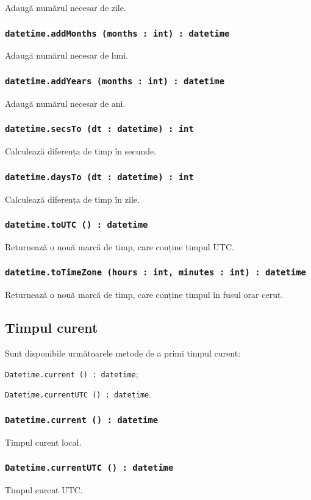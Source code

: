 Adaugă numărul necesar de zile.

\subsubsection{\texttt{datetime.addMonths (months : int) : datetime}}

Adaugă numărul necesar de luni.

\subsubsection{\texttt{datetime.addYears (months : int) : datetime}}

Adaugă numărul necesar de ani.

\subsubsection{\texttt{datetime.secsTo (dt : datetime) : int}}

Calculează diferența de timp în secunde.

\subsubsection{\texttt{datetime.daysTo (dt : datetime) : int}}

Calculează diferența de timp în zile.

\subsubsection{\texttt{datetime.toUTC () : datetime}}

Returnează o nouă marcă de timp, care conține timpul UTC.

\subsubsection{\texttt{datetime.toTimeZone (hours : int, minutes : int) : datetime}}

Returnează o nouă marcă de timp, care conține timpul în fusul orar cerut.

\subsection{Timpul curent}

Sunt disponibile următoarele metode de a primi timpul curent:
\begin{icItems}
	\item \texttt{Datetime.current () : datetime};
	\item \texttt{Datetime.currentUTC () : datetime}.
\end{icItems}

\subsubsection{\texttt{Datetime.current () : datetime}}

Timpul curent local.

\subsubsection{\texttt{Datetime.currentUTC () : datetime}}

Timpul curent UTC.